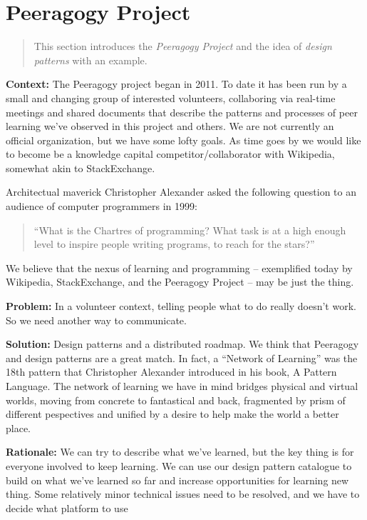 \section{Peeragogy Project}

\begin{quote}
This section introduces the \emph{Peeragogy Project} and the idea of \emph{design patterns} with an example.
\end{quote}

\textbf{Context:}  The Peeragogy project began in 2011.  To date it has been run by a small and changing group of interested volunteers, collaboring via real-time meetings and shared documents that describe the patterns and processes of peer learning we've observed in this project and others.   We are not currently an official organization, but we have some lofty goals.  As time goes by we would like to become be a knowledge capital competitor/collaborator with Wikipedia, somewhat akin to StackExchange.  

Architectual maverick Christopher Alexander asked the following question to an audience of computer programmers in 1999: 
\begin{quote}
``What is the Chartres of programming? What task is at a high enough level to inspire people writing programs, to reach for the stars?''
\end{quote}
We believe that the nexus of learning and programming -- exemplified today by Wikipedia, StackExchange, and the Peeragogy Project -- may be just the thing.

\textbf{Problem:} In a volunteer context, telling people what to do really doesn't work.  So we need another way to communicate.

\textbf{Solution:} Design patterns and a distributed roadmap.
We think that Peeragogy and design patterns are a great match.  In fact, a ``Network of Learning'' was the 18th pattern that Christopher Alexander introduced in his book, A Pattern Language.  The network of learning we have in mind bridges physical and virtual worlds, moving from concrete to fantastical and back, fragmented by prism of different pespectives and unified by a desire to help make the world a better place. 

\textbf{Rationale:}
We can try to describe what we've learned, but the key thing is for everyone involved to keep learning. We can use our design pattern catalogue to build on what we've learned so far and increase opportunities for learning new thing.
Some relatively minor technical issues need to be resolved, and we
have to decide what platform to use

